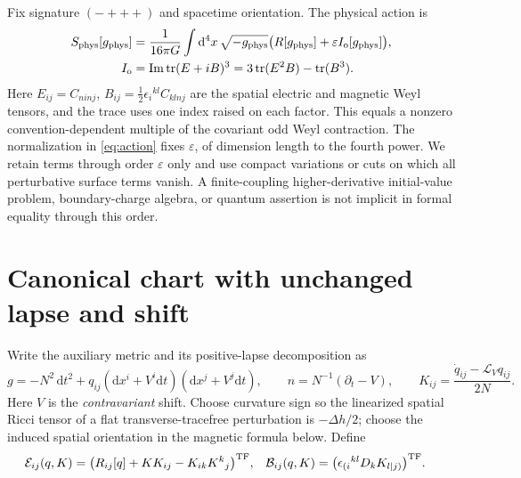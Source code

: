 \documentclass[11pt]{article}
\newcommand{\dd}{\mathrm d}
\newcommand{\eps}{\varepsilon}
\newcommand{\TF}{\mathrm{TF}}
\newcommand{\tr}{\operatorname{tr}}
\newcommand{\Lie}{\mathcal L}
\newcommand{\GN}{16\pi G}
\begin{document}
Fix signature \((-+++)\) and spacetime orientation. The physical action is
\begin{align}
 S_{\rm phys}[g_{\rm phys}]
 &=\frac{1}{\GN}\int \dd^4x\,\sqrt{-g_{\rm phys}}
      \bigl(R[g_{\rm phys}]+\eps I_{\rm o}[g_{\rm phys}]\bigr),
 \label{eq:action}\\
 I_{\rm o}&=\operatorname{Im}\tr(E+iB)^3
              =3\tr(E^2B)-\tr(B^3).\nonumber
\end{align}
Here \(E_{ij}=C_{ninj}\), \(B_{ij}=\tfrac12\epsilon_i{}^{kl}C_{kl n j}\) are the spatial electric and magnetic Weyl tensors, and the trace uses one index raised on each factor. This equals a nonzero convention-dependent multiple of the covariant odd Weyl contraction. The normalization in \eqref{eq:action} fixes \(\eps\), of dimension length to the fourth power. We retain terms through order \(\eps\) only and use compact variations or cuts on which all perturbative surface terms vanish. A finite-coupling higher-derivative initial-value problem, boundary-charge algebra, or quantum assertion is not implicit in formal equality through this order.

\section{Canonical chart with unchanged lapse and shift}

Write the auxiliary metric and its positive-lapse decomposition as
\[
 g=-N^2\,\dd t^2+q_{ij}(\dd x^i+V^i\dd t)(\dd x^j+V^j\dd t),
 \qquad
 n=N^{-1}(\partial_t-V),\qquad
 K_{ij}=\frac{\dot q_{ij}-\Lie_Vq_{ij}}{2N}.
\]
Here \(V\) is the \emph{contravariant} shift. Choose curvature sign so the linearized spatial Ricci tensor of a flat transverse-tracefree perturbation is \(-\Delta h/2\); choose the induced spatial orientation in the magnetic formula below. Define
\begin{align}
 {\cal E}_{ij}(q,K)&=\bigl(R_{ij}[q]+K K_{ij}-K_{ik}K^k{}_j\bigr)^{\TF},
 &
 {\cal B}_{ij}(q,K)&=\bigl(\epsilon_{(i}{}^{kl}D_kK_{l|j)}\bigr)^{\TF}.
 \label{eq:carriers}
\end{align}
\end{document}
